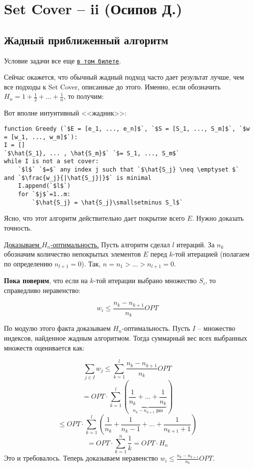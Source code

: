 \section{Set Cover -- ii (Осипов Д.)}
\subsection{Жадный приближенный алгоритм}
Условие задачи все еще \hyperlink{setcover}{\texttt{в том билете}}.

Сейчас окажется, что обычный жадный подход часто дает результат лучше, чем все подходы к Set Cover, описанные до этого. Именно, если обозначить $H_n = 1 + \frac{1}{2} + ... + \frac{1}{n}$, то получим:


Вот вполне интуитивный <<жадник>>:

\begin{lstlisting}[escapeinside=``]
function Greedy (`$E = [e_1, ..., e_n]$`, `$S = [S_1, ..., S_m]$`, `$w = [w_1, ..., w_m]$`):
I = []
`$\hat{S_1}, ... , \hat{S_m}$` `$= S_1, ..., S_m$`
while I is not a set cover:
    `$l$` `$=$` any index j such that `$\hat{S_j} \neq \emptyset $` and `$\frac{w_j}{|\hat{S_j}|}$` is minimal
    I.append(`$l$`)
    for `$j$`=1..m:
        `$\hat{S_j} = \hat{S_j}\smallsetminus S_l$`
\end{lstlisting}

Ясно, что этот алгоритм действительно дает покрытие всего $E$. Нужно доказать точность.

\underline{Доказываем $H_n$-оптимальность.} Пусть алгоритм сделал $l$ итераций. За $n_k$ обозначим количество непокрытых элементов $E$ перед $k$-той итерацией (полагаем по определению $n_{l+1}=0$). Так, $n = n_1 > ... > n_{l+1} = 0$. 

\textbf{Пока поверим}, что если на $k$-той итерации выбрано множество $S_i$, то справедливо неравенство:

$$w_i \leq \frac{n_k - n_{k+1}}{n_k}OPT$$

По модулю этого факта доказываем $H_n$-оптимальность. Пусть $I$ -- множество индексов, найденное жадным алгоритмом. Тогда суммарный вес всех выбранных множеств оценивается как:

$$\sum_{j\in I}w_j \leq \sum_{k=1}^l\frac{n_k-n_{k+1}}{n_k} OPT$$
$$ = OPT\cdot\sum_{k=1}^l\left(\underbrace{\frac{1}{n_k} + ... + \frac{1}{n_k}}_{n_k-n_{k+1}\text{ раз}}\right)$$
$$ \leq OPT \cdot\sum_{k=1}^l\left(\frac{1}{n_k} + \frac{1}{n_k - 1} + ... + \frac{1}{n_{k+1}+1}\right)$$
$$ = OPT\cdot\sum_{k=1}^n\frac{1}{k} = OPT\cdot H_n$$
Это и требовалось. Теперь доказываем неравенство $w_i \leq \frac{n_k - n_{k+1}}{n_k}OPT$.

